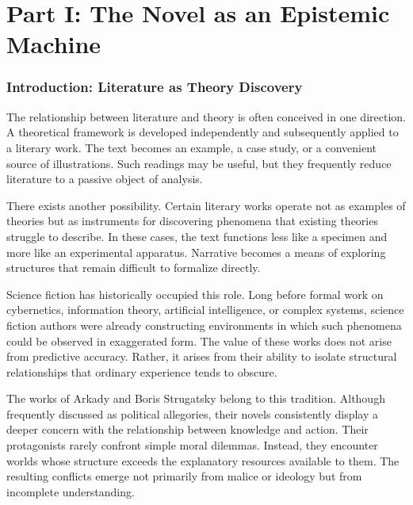 \documentclass[12pt, a4paper]{article}
\theoremstyle{plain}
\theoremstyle{definition}
\theoremstyle{remark}
\begin{document}
\part*{Part I: The Novel as an Epistemic Machine}

\section{Introduction: Literature as Theory Discovery}

The relationship between literature and theory is often
conceived in one direction. A theoretical framework is
developed independently and subsequently applied to a
literary work. The text becomes an example, a case study,
or a convenient source of illustrations. Such readings
may be useful, but they frequently reduce literature to
a passive object of analysis.

There exists another possibility. Certain literary works
operate not as examples of theories but as instruments
for discovering phenomena that existing theories struggle
to describe. In these cases, the text functions less like
a specimen and more like an experimental apparatus.
Narrative becomes a means of exploring structures that
remain difficult to formalize directly.

Science fiction has historically occupied this role.
Long before formal work on cybernetics, information
theory, artificial intelligence, or complex systems,
science fiction authors were already constructing
environments in which such phenomena could be observed
in exaggerated form. The value of these works does not
arise from predictive accuracy. Rather, it arises from
their ability to isolate structural relationships that
ordinary experience tends to obscure.

The works of Arkady and Boris Strugatsky belong to this
tradition. Although frequently discussed as political
allegories, their novels consistently display a deeper
concern with the relationship between knowledge and action.
Their protagonists rarely confront simple moral dilemmas.
Instead, they encounter worlds whose structure exceeds
the explanatory resources available to them. The resulting
conflicts emerge not primarily from malice or ideology
but from incomplete understanding.
\end{document}
